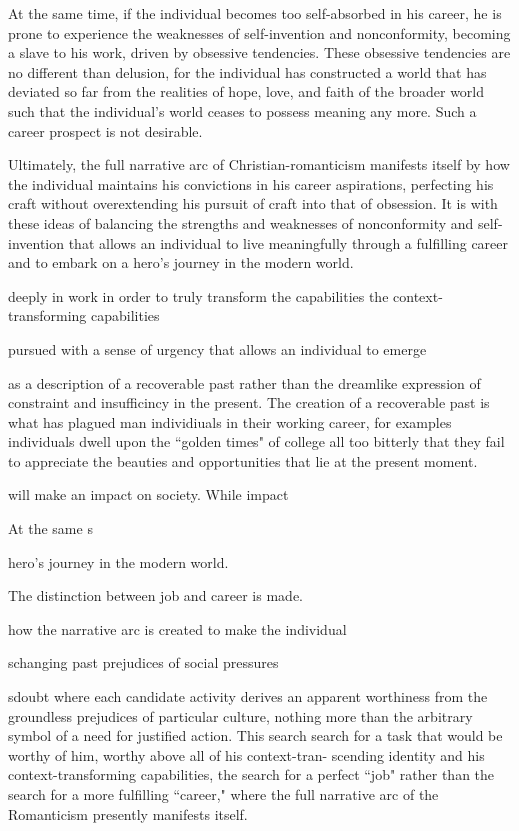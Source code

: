 \documentclass[12pt,letterpaper]{article}
\newif\ifdraft
\begin{document}
At the same time, if the individual becomes too self-absorbed in his career, he is prone to experience the weaknesses of self-invention and nonconformity, becoming a slave to his work, driven by obsessive tendencies.  These obsessive tendencies are no different than delusion, for the individual has constructed a world that has deviated so far from the realities of hope, love, and faith of the broader world such that the individual's world ceases to possess meaning any more.  Such a career prospect is not desirable.

Ultimately, the full narrative arc of Christian-romanticism manifests itself by how the individual maintains his convictions in his career aspirations, perfecting his craft without overextending his pursuit of craft into that of obsession.  It is with these ideas of balancing the strengths and weaknesses of nonconformity and self-invention that allows an individual to live meaningfully through a fulfilling career and to embark on a
hero's journey in the modern world.

\ifdraft

 deeply in work in order to truly transform the capabilities the context-transforming capabilities

pursued with a sense of urgency that allows an individual to emerge 

as a description of a recoverable past rather than the dreamlike expression of 
constraint and insufficincy in the present.  The creation of a recoverable past is 
what has plagued man individiuals in their working career, for examples 
individuals dwell upon the ``golden times" of college all too bitterly that they 
fail to appreciate the beauties and opportunities that lie at the present 
moment. 

will make an impact on society.  While impact 

At the same s

 hero's journey in the modern world.

The distinction between job and career is made.  


 how the narrative arc is created to make the individual

schanging past prejudices of social pressures 

sdoubt where each candidate activity derives an apparent worthiness from the groundless prejudices of particular culture, nothing more than the arbitrary symbol of a need for justified action.  This search search for a  task that would be worthy of him, worthy above all of his context-tran- scending identity and his context-transforming capabilities, the search for a perfect ``job" rather than the search for a more fulfilling ``career," where the full narrative arc of the Romanticism presently manifests itself.
\end{document}
